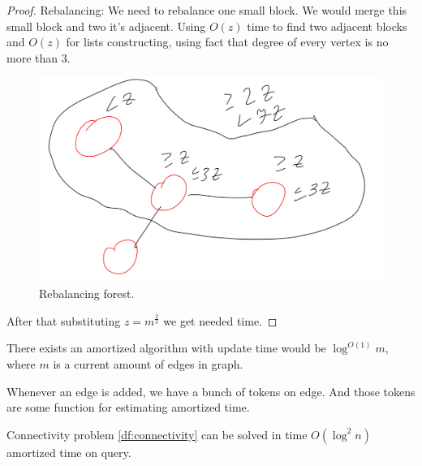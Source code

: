 \begin{proof}
  Rebalancing:
  We need to rebalance one small block. We would merge this small block and two it's adjacent.
  Using $O(z)$ time to find two adjacent blocks and $O(z)$ for lists constructing, using fact that degree of every vertex is no more than $3$.

\begin{figure}[H]
	\centering
	\includegraphics[width=0.5\linewidth]{figures/connectivity_rebalancing.jpeg}
	\caption{Rebalancing forest.}
	\label{fig:connectivity_rebalancing}
\end{figure}

  After that substituting $z = m^{\frac{2}{3}}$ we get needed time.

\end{proof}

\begin{algorithm}
	There exists an amortized algorithm with update time would be $\log^{O(1)} m$, where $m$ is a current amount of edges in graph.
\end{algorithm}

Whenever an edge is added, we have a bunch of tokens on edge.
And those tokens are some function for estimating amortized time.

\begin{thm}
	Connectivity problem \ref{df:connectivity} can be solved in time $O(\log^2 n)$ amortized time on query.
\end{thm}

